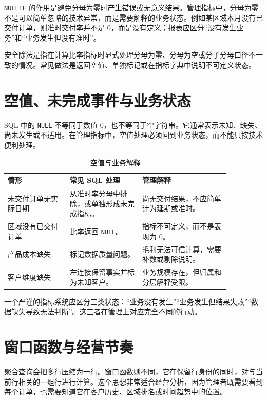 \documentclass[UTF8,fontset=fandol,openany,zihao=-4]{ctexbook}
\begin{document}
\texttt{NULLIF} 的作用是避免分母为零时产生错误或无意义结果。管理指标中，分母为零不是可以简单忽略的技术异常，而是需要解释的业务状态。例如某区域本月没有已交付订单，则准时交付率并不是 0，而是没有定义；报表应区分“没有发生业务”和“业务发生但没有准时”。

\begin{definition}[安全除法]
安全除法是指在计算比率指标时显式处理分母为零、分母为空或分子分母口径不一致的情况。常见做法是返回空值、单独标记或在指标字典中说明不可定义状态。
\end{definition}

\section{空值、未完成事件与业务状态}

SQL 中的 \texttt{NULL} 不等同于数值 0，也不等同于空字符串。它通常表示未知、缺失、尚未发生或不适用。在管理指标中，空值处理必须回到业务状态，而不能只按技术便利处理。

\begin{table}[htbp]
\centering
\caption{空值与业务解释}
\begin{tabular}{p{0.24\linewidth}p{0.28\linewidth}p{0.34\linewidth}}
\toprule
情形 & 常见 SQL 处理 & 管理解释\\
\midrule
未交付订单无实际日期 & 从准时率分母中排除，或单独形成未完成指标。 & 尚无交付结果，不应简单计为延期或准时。\\
区域没有已交付订单 & 比率返回 \texttt{NULL}。 & 指标不可定义，而不是表现为 0。\\
产品成本缺失 & 标记数据质量问题。 & 毛利无法可信计算，需要补数或剔除说明。\\
客户维度缺失 & 左连接保留事实并标为未知客户。 & 业务规模存在，但归属和分层解释受限。\\
\bottomrule
\end{tabular}
\end{table}

\begin{remark}
一个严谨的指标系统应区分三类状态：“业务没有发生”“业务发生但结果失败”“数据缺失导致无法判断”。这三者在管理上对应完全不同的行动。
\end{remark}

\section{窗口函数与经营节奏}

聚合查询会把多行压缩为一行。窗口函数则不同，它在保留行身份的同时，对与当前行相关的一组行进行计算。这个思想非常适合经营分析，因为管理者既需要看到每个订单，也需要知道它在客户历史、区域排名或时间趋势中的位置。
\end{document}
